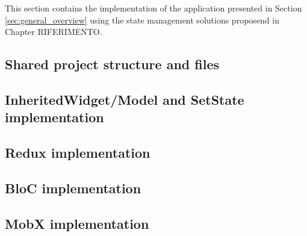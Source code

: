This section contains the implementation of the application presented in Section \ref{sec:general_overview} using the state management solutions proposend in Chapter RIFERIMENTO.

\subsection{Shared project structure and files}
\label{subsec:todo_app_shared_project_structure}


\subsection{InheritedWidget/Model and SetState implementation}
\label{subsec:todo_app_inheritedwidget_implementation}


\subsection{Redux implementation}
\label{subsec:todo_app_redux_implementation}


\subsection{BloC implementation}
\label{subsec:todo_app_bloc_implementation}


\subsection{MobX implementation}
\label{subsec:todo_app_mobx_implementation}

